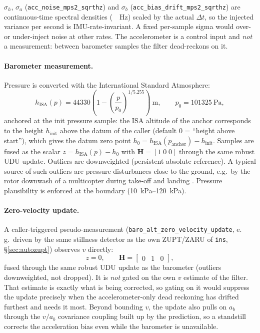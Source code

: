 \documentclass[11pt,a4paper]{article}
\newcommand{\mat}[1]{\bm{#1}}
\newcommand{\dt}{\Delta t}
\newcommand{\code}[1]{\texttt{#1}}
\begin{document}
$\sigma_h$, $\sigma_a$ (\code{acc\_\allowbreak{}noise\_\allowbreak{}mps2\_\allowbreak{}sqrthz}) and $\sigma_b$
(\code{acc\_\allowbreak{}bias\_\allowbreak{}drift\_\allowbreak{}mps2\_\allowbreak{}sqrthz}) are continuous-time spectral densities
(\si{\per\sqrt\hertz}) scaled by the actual $\dt$, so the injected variance per
second is IMU-rate-invariant. A fixed per-sample sigma would over- or
under-inject noise at other rates. The accelerometer is a control input and
\emph{not} a measurement: between barometer samples the filter dead-reckons on
it.

\paragraph{Barometer measurement.} Pressure is converted with the
International Standard Atmosphere:
\begin{equation}
  h_{\text{ISA}}(p) = 44330 \left( 1 -
    \left(\frac{p}{p_0}\right)^{1/5.255} \right)\ \si{\metre},
  \qquad p_0 = \SI{101325}{\pascal},
  \label{eq:isa}
\end{equation}
anchored at the init pressure sample: the ISA altitude of the anchor
corresponds to the height $h_{\text{init}}$ above the datum of the caller
(default 0 = ``height above start''), which gives the datum zero point
$h_0 = h_{\text{ISA}}(p_{\text{anchor}}) - h_{\text{init}}$. Samples are
fused as the scalar $z = h_{\text{ISA}}(p) - h_0$ with
$\mat{H} = [1\;0\;0]$ through the same robust UDU update.
Outliers are downweighted (persistent absolute reference). A typical source
of such outliers are pressure disturbances close to the ground, e.g.\ by the
rotor downwash of a multicopter during take-off and landing \cite{zwiener2019}.
Pressure plausibility is enforced at the boundary (\SIrange{10}{120}{\kilo\pascal}).

\paragraph{Zero-velocity update.} A caller-triggered pseudo-measurement
(\code{baro\_\allowbreak{}alt\_\allowbreak{}zero\_\allowbreak{}velocity\_\allowbreak{}update}, e.\,g.\ driven by the same
stillness detector as the own ZUPT/ZARU of \code{ins}, \S\ref{sec:autozupt})
observes $v$ directly:
\begin{equation}
  z = 0, \qquad \mat{H} = \begin{bmatrix} 0 & 1 & 0 \end{bmatrix},
\end{equation}
fused through the same robust UDU update as the barometer (outliers
downweighted, not dropped). It is \emph{not} gated on the own $v$ estimate of the
filter. That estimate is exactly what is being corrected, so gating on it would
suppress the update precisely when the accelerometer-only dead reckoning has
drifted furthest and needs it most. Beyond bounding $v$, the update also pulls
on $a_b$ through the $v/a_b$ covariance coupling built up by the prediction, so
a standstill corrects the acceleration bias even while the barometer is
unavailable.
\end{document}
